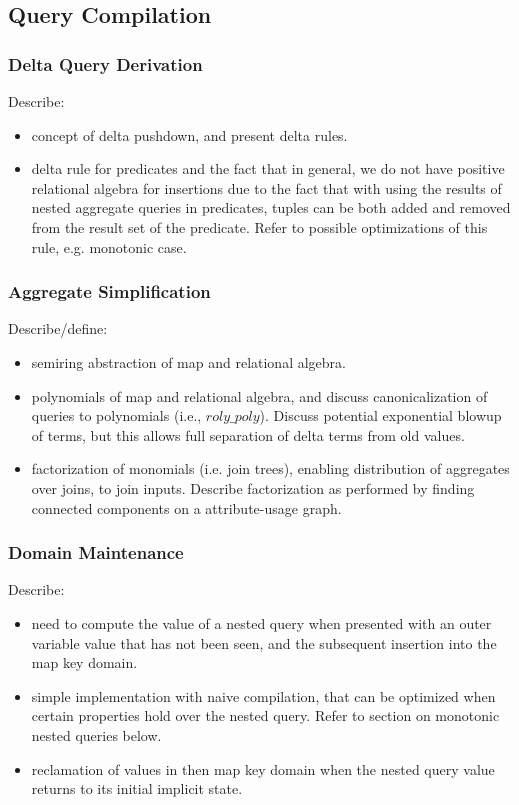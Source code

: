 \documentclass{sig-alternate}
\begin{document}
\subsection{Query Compilation}

\subsubsection{Delta Query Derivation}
Describe:
\begin{itemize}
\item concept of delta pushdown, and present delta rules.
\item delta rule for predicates and the fact that in general, we do not
  have positive relational algebra for insertions due to the fact that with
  using the results of nested aggregate queries in predicates, tuples can be
  both added and removed from the result set of the predicate. Refer to possible
  optimizations of this rule, e.g. monotonic case.
\end{itemize}

\subsubsection{Aggregate Simplification}
Describe/define:
\begin{itemize}
\item semiring abstraction of map and relational algebra.
\item polynomials of map and relational algebra, and discuss
canonicalization of queries to polynomials (i.e., $roly\_poly$). Discuss
potential exponential blowup of terms, but this allows full separation of delta
terms from old values.
\item factorization of monomials (i.e. join trees), enabling distribution
  of aggregates over joins, to join inputs. Describe factorization as performed
  by finding connected components on a attribute-usage graph.
\end{itemize}

\subsubsection{Domain Maintenance}
Describe:
\begin{itemize}
\item need to compute the value of a nested query when presented with
  an outer variable value that has not been seen, and the subsequent insertion
  into the map key domain.
\item simple implementation with naive compilation, that can be
  optimized when certain properties hold over the nested query. Refer to section
  on monotonic nested queries below.
\item reclamation of values in then map key domain when the nested
  query value returns to its initial implicit state.
\end{itemize}
\end{document}

